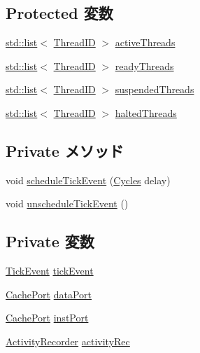 \subsection*{Protected 変数}
\begin{DoxyCompactItemize}
\item 
\hyperlink{classstd_1_1list}{std::list}$<$ \hyperlink{base_2types_8hh_ab39b1a4f9dad884694c7a74ed69e6a6b}{ThreadID} $>$ \hyperlink{classInOrderCPU_ae8939711cc7f6e9c795d16df91f9f258}{activeThreads}
\item 
\hyperlink{classstd_1_1list}{std::list}$<$ \hyperlink{base_2types_8hh_ab39b1a4f9dad884694c7a74ed69e6a6b}{ThreadID} $>$ \hyperlink{classInOrderCPU_afcee8801ebda6ab96f79e89b9618fc31}{readyThreads}
\item 
\hyperlink{classstd_1_1list}{std::list}$<$ \hyperlink{base_2types_8hh_ab39b1a4f9dad884694c7a74ed69e6a6b}{ThreadID} $>$ \hyperlink{classInOrderCPU_adee15257888edfe2927ee23593ff44bb}{suspendedThreads}
\item 
\hyperlink{classstd_1_1list}{std::list}$<$ \hyperlink{base_2types_8hh_ab39b1a4f9dad884694c7a74ed69e6a6b}{ThreadID} $>$ \hyperlink{classInOrderCPU_ac4a971a8b09e053f4bf9bfcd6748995d}{haltedThreads}
\end{DoxyCompactItemize}
\subsection*{Private メソッド}
\begin{DoxyCompactItemize}
\item 
void \hyperlink{classInOrderCPU_a71eb9ea7b25032de341033111b946dfc}{scheduleTickEvent} (\hyperlink{classCycles}{Cycles} delay)
\item 
void \hyperlink{classInOrderCPU_ad819e7898bd94721d107a35fde764390}{unscheduleTickEvent} ()
\end{DoxyCompactItemize}
\subsection*{Private 変数}
\begin{DoxyCompactItemize}
\item 
\hyperlink{classInOrderCPU_1_1TickEvent}{TickEvent} \hyperlink{classInOrderCPU_aa36b8e894416f0ec98f701ab08f2ac22}{tickEvent}
\item 
\hyperlink{classInOrderCPU_1_1CachePort}{CachePort} \hyperlink{classInOrderCPU_a8e4a84e6f2b11310fbb12e5b7598947f}{dataPort}
\item 
\hyperlink{classInOrderCPU_1_1CachePort}{CachePort} \hyperlink{classInOrderCPU_a170c2f44ce8ed65aee6cf1da2a0e6296}{instPort}
\item 
\hyperlink{classActivityRecorder}{ActivityRecorder} \hyperlink{classInOrderCPU_ae5ad3ebe67382e7fbc7fddcf48ae9c6c}{activityRec}
\end{DoxyCompactItemize}
